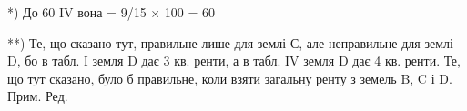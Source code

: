 *) До 60%
IV вона = 9/15 × 100 = 60%

**) Те, що сказано тут, правильне лише для землі С, але неправильне для землі D, бо в табл. І земля
D дає 3 кв. ренти, а в табл. IV земля D дає 4 кв. ренти. Те, що тут сказано, було б правильне, коли
взяти загальну ренту з земель B, C і D. Прим. Ред.
